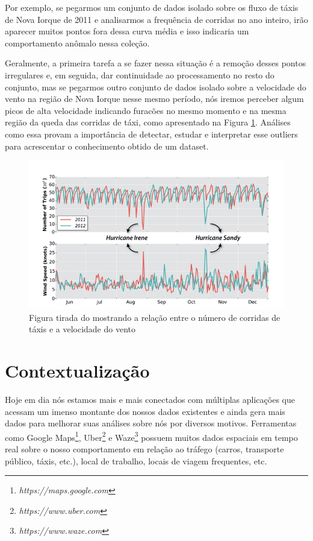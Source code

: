 Por exemplo, se pegarmos um conjunto de dados isolado sobre os fluxo de táxis de Nova Iorque de 2011 e analisarmos a frequência de corridas no ano inteiro, irão aparecer muitos pontos fora dessa curva média e isso indicaria um comportamento anômalo nessa coleção.

Geralmente, a primeira tarefa a se fazer nessa situação é a remoção desses pontos irregulares e, em seguida, dar continuidade ao processamento no resto do conjunto, mas se pegarmos outro conjunto de dados isolado sobre a velocidade do vento na região de Nova Iorque nesse mesmo período, nós iremos perceber algum picos de alta velocidade indicando furacões no mesmo momento e na mesma região da queda das corridas de táxi, como apresentado na Figura \ref{fig:freire-paper-taxi-wind}. Análises como essa provam a importância de detectar, estudar e interpretar esse outliers para acrescentar o conhecimento obtido de um dataset.

\begin{figure}[t]
	\centering
	\includegraphics[width=\textwidth]{images/outlier-freire-figure-1}
	\caption{Figura tirada do \cite{DBLP:journals/debu/FreireCVZ16} mostrando a relação entre o número de corridas de táxis e a velocidade do vento}
	\label{fig:freire-paper-taxi-wind}
	\vspace{-10pt}
\end{figure}

\section{Contextualização}

Hoje em dia nós estamos mais e mais conectados com múltiplas aplicações que acessam um imenso montante dos nossos dados existentes e ainda gera mais dados para melhorar suas análises sobre nós por diversos motivos. Ferramentas como Google Maps\footnote{\it https://maps.google.com}, Uber\footnote{\it https://www.uber.com} e Waze\footnote{\it https://www.waze.com} possuem muitos dados espaciais em tempo real sobre o nosso comportamento em relação ao tráfego (carros, transporte público, táxis, etc.), local de trabalho, locais de viagem frequentes, etc.

